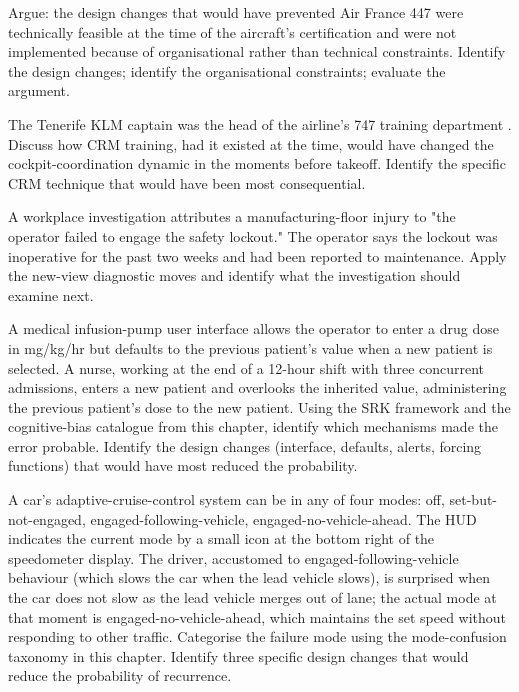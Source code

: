 \begin{exercise}
Argue: the design changes that would have prevented Air France 447 \cite{acc:bea-af447} were technically feasible at the time of the aircraft's certification and were not implemented because of organisational rather than technical constraints. Identify the design changes; identify the organisational constraints; evaluate the argument.
\end{exercise}

\begin{exercise}
The Tenerife KLM captain was the head of the airline's 747 training department \cite{acc:ciaiac-tenerife-1978}. Discuss how CRM training, had it existed at the time, would have changed the cockpit-coordination dynamic in the moments before takeoff. Identify the specific CRM technique that would have been most consequential.
\end{exercise}

\begin{exercise}
A workplace investigation attributes a manufacturing-floor injury to "the operator failed to engage the safety lockout." The operator says the lockout was inoperative for the past two weeks and had been reported to maintenance. Apply the new-view diagnostic moves and identify what the investigation should examine next.
\end{exercise}

\begin{exercise}
A medical infusion-pump user interface allows the operator to enter a drug dose in mg/kg/hr but defaults to the previous patient's value when a new patient is selected. A nurse, working at the end of a 12-hour shift with three concurrent admissions, enters a new patient and overlooks the inherited value, administering the previous patient's dose to the new patient. Using the SRK framework \cite{paper:rasmussen-skills-rules-knowledge-1983} and the cognitive-bias catalogue from this chapter, identify which mechanisms made the error probable. Identify the design changes (interface, defaults, alerts, forcing functions) that would have most reduced the probability.
\end{exercise}

\begin{exercise}
A car's adaptive-cruise-control system can be in any of four modes: off, set-but-not-engaged, engaged-following-vehicle, engaged-no-vehicle-ahead. The HUD indicates the current mode by a small icon at the bottom right of the speedometer display. The driver, accustomed to engaged-following-vehicle behaviour (which slows the car when the lead vehicle slows), is surprised when the car does not slow as the lead vehicle merges out of lane; the actual mode at that moment is engaged-no-vehicle-ahead, which maintains the set speed without responding to other traffic. Categorise the failure mode using the mode-confusion taxonomy in this chapter. Identify three specific design changes that would reduce the probability of recurrence.
\end{exercise}
